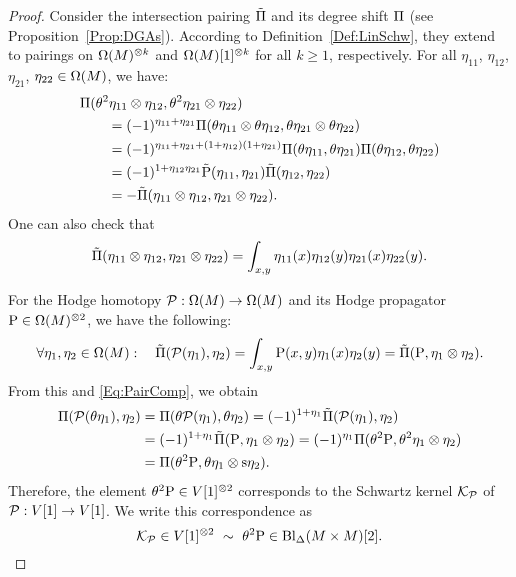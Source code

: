 \documentclass[\MainFolder/Text.tex]{subfiles}
\begin{document}
\begin{proof}
Consider the intersection pairing $\tilde{\Pi}$ and its degree shift $\Pi$ (see Proposition~\ref{Prop:DGAs}). According to Definition~\ref{Def:LinSchw}, they extend to pairings on $\Omega(M)^{\otimes k}$ and $\Omega(M)[1]^{\otimes k}$ for all $k\ge 1$, respectively. For all $\eta_{11}$, $\eta_{12}$, $\eta_{21}$, $\eta_{22}\in \Omega(M)$, we have:
\begin{equation}\label{Eq:PairComp}
\begin{aligned}
&\Pi(\theta^2 \eta_{11}\otimes \eta_{12},\theta^2 \eta_{21}\otimes \eta_{22}) \\ 
&\qquad = (-1)^{\eta_{11} + \eta_{21}} \Pi(\theta\eta_{11}\otimes \theta\eta_{12}, \theta \eta_{21}\otimes \theta\eta_{22}) \\
&\qquad = (-1)^{\eta_{11} + \eta_{21} + (1+\eta_{12})(1+\eta_{21})} \Pi(\theta \eta_{11}, \theta \eta_{21}) \Pi(\theta \eta_{12},\theta \eta_{22})\\
&\qquad =(-1)^{1+\eta_{12}\eta_{21}} \tilde{\mathrm{P}}(\eta_{11},\eta_{21})\tilde{\Pi}(\eta_{12},\eta_{22}) \\
&\qquad = - \tilde{\Pi}(\eta_{11}\otimes \eta_{12}, \eta_{21}\otimes \eta_{22}).
\end{aligned}
\end{equation}
One can also check that
\[ \tilde{\Pi}(\eta_{11} \otimes \eta_{12}, \eta_{21}\otimes\eta_{22}) = \int_{x,y} \eta_{11}(x)\eta_{12}(y)\eta_{21}(x)\eta_{22}(y). \]

For the Hodge homotopy $\mathcal{P}: \Omega(M) \rightarrow \Omega(M)$ and its Hodge propagator $\mathrm{P} \in \Omega(M)^{\otimes 2}$, we have the following:
\[ \forall \eta_1, \eta_2\in \Omega(M): \quad \tilde{\Pi}(\mathcal{P}(\eta_1),\eta_2) = \int_{x,y} \mathrm{P}(x,y)\eta_1(x)\eta_2(y) = \tilde{\Pi}(\mathrm{P}, \eta_1\otimes \eta_2). \]
From this and \eqref{Eq:PairComp}, we obtain
\[\begin{aligned}
\Pi(\mathcal{P}(\theta \eta_1),\eta_2) &= \Pi(\theta \mathcal{P}(\eta_1),\theta \eta_2) = (-1)^{1+\eta_1} \tilde{\Pi}(\mathcal{P}(\eta_1),\eta_2) \\ &= (-1)^{1+\eta_1} \tilde{\Pi}(\mathrm{P},\eta_1\otimes \eta_2) = (-1)^{\eta_1}\Pi(\theta^2 \mathrm{P}, \theta^2 \eta_1 \otimes \eta_2)  \\ &= \Pi(\theta^2 \mathrm{P}, \theta\eta_1 \otimes \mathrm{s}\eta_2).
\end{aligned}\]
Therefore, the element $\theta^{2} \mathrm{P} \in V[1]^{\otimes 2}$ corresponds to the Schwartz kernel $\mathcal{K}_{\mathcal{P}}$ of $\mathcal{P}: V[1] \rightarrow V[1]$. We write this correspondence as
\[ \mathcal{K}_{\mathcal{P}}\in V[1]^{\otimes 2}\ \sim\ \theta^2 \mathrm{P} \in \mathrm{Bl}_\Delta(M\times M)[2]. \]


\end{proof}
\end{document}

